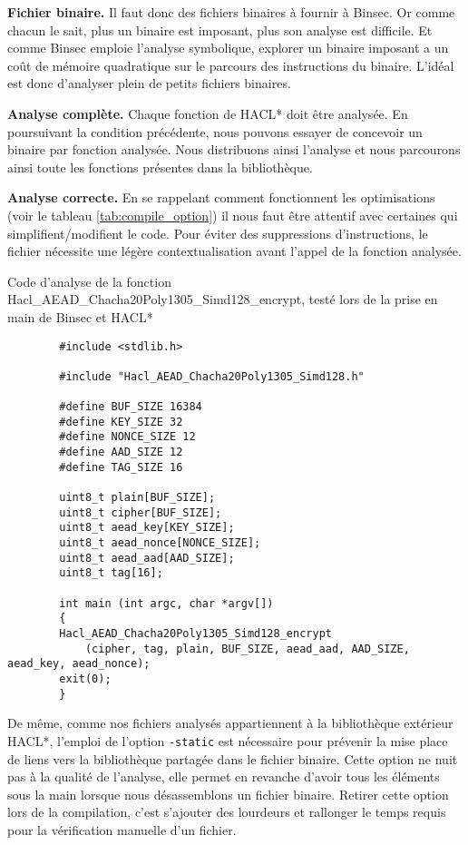 \textbf{Fichier binaire.} Il faut donc des fichiers binaires à fournir à Binsec. Or comme chacun le sait, plus un binaire est imposant, plus son analyse est difficile. Et comme Binsec emploie l'analyse symbolique, explorer un binaire imposant a un coût de mémoire quadratique sur le parcours des instructions du binaire. L'idéal est donc d'analyser plein de petits fichiers binaires.\smallbreak

\textbf{Analyse complète.} Chaque fonction de HACL* doit être analysée. En poursuivant la condition précédente, nous pouvons essayer de concevoir un binaire par fonction analysée. Nous distribuons ainsi l'analyse et nous parcourons ainsi toute les fonctions présentes dans la bibliothèque.\medbreak

\textbf{Analyse correcte.} En se rappelant comment fonctionnent les optimisations (voir le tableau \ref{tab:compile_option}) il nous faut être attentif avec certaines qui simplifient/modifient le code. Pour éviter des suppressions d'instructions, le fichier nécessite une légère contextualisation avant l'appel de la fonction analysée.

\begin{listing}[!ht]
    \caption{Code d'analyse de la fonction Hacl\_AEAD\_Chacha20Poly1305\_Simd128\-\_encrypt, testé lors de la prise en main de Binsec et HACL*}
    \label{lst:prise_en_main}
    \begin{verbatim}
        #include <stdlib.h>

        #include "Hacl_AEAD_Chacha20Poly1305_Simd128.h"

        #define BUF_SIZE 16384
        #define KEY_SIZE 32
        #define NONCE_SIZE 12
        #define AAD_SIZE 12
        #define TAG_SIZE 16

        uint8_t plain[BUF_SIZE];
        uint8_t cipher[BUF_SIZE];
        uint8_t aead_key[KEY_SIZE];
        uint8_t aead_nonce[NONCE_SIZE];
        uint8_t aead_aad[AAD_SIZE];
        uint8_t tag[16];

        int main (int argc, char *argv[])
        {
        Hacl_AEAD_Chacha20Poly1305_Simd128_encrypt
            (cipher, tag, plain, BUF_SIZE, aead_aad, AAD_SIZE, aead_key, aead_nonce);
        exit(0);
        }
    \end{verbatim}
\end{listing}

De même, comme nos fichiers analysés appartiennent à la bibliothèque extérieur HACL*, l'emploi de l'option \texttt{-static} est nécessaire pour prévenir la mise place de liens vers la bibliothèque partagée dans le fichier binaire. Cette option ne nuit pas à la qualité de l'analyse, elle permet en revanche d'avoir tous les éléments sous la main lorsque nous désassemblons un fichier binaire. Retirer cette option lors de la compilation, c'est s'ajouter des lourdeurs et rallonger le temps requis pour la vérification manuelle d'un fichier.\medbreak

